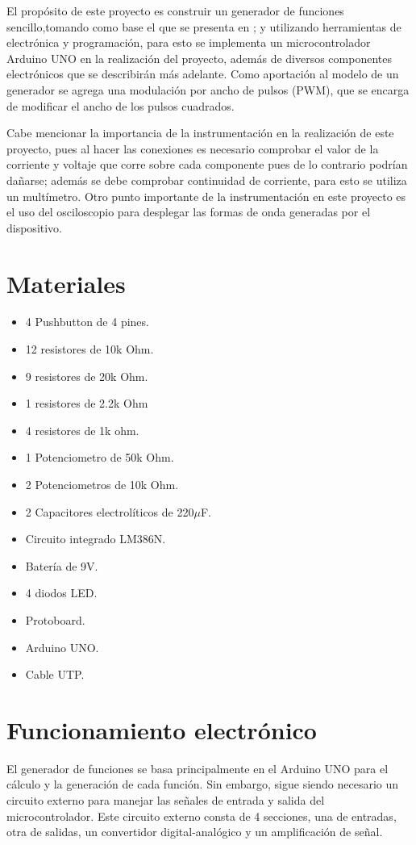 \documentclass[11pt]{article}
\begin{document}
El propósito de este proyecto es construir un generador de funciones sencillo,tomando como base el que se presenta en \cite{amandaghassaei}; y utilizando herramientas de electrónica y programación, para esto se implementa un microcontrolador Arduino UNO en la realización del proyecto, además de diversos componentes electrónicos que se describirán más adelante. Como aportación al modelo de un generador se agrega una modulación por ancho de pulsos (PWM), que se encarga de modificar el ancho de los pulsos cuadrados.

Cabe mencionar la importancia de la instrumentación en la realización de este proyecto, pues al hacer las conexiones es necesario comprobar el valor de la corriente y voltaje que corre sobre cada componente pues de lo contrario podrían dañarse; además se debe comprobar continuidad de corriente, para esto se utiliza un multímetro. Otro punto importante de la instrumentación en este proyecto es el uso del osciloscopio para desplegar las formas de onda generadas por el dispositivo.



\section{Materiales}
\begin{multicols}{2}
\begin{itemize}
\item 4 Pushbutton de 4 pines.
\item 12 resistores de 10k Ohm.
\item 9 resistores de 20k Ohm.
\item 1 resistores de 2.2k Ohm
\item 4 resistores de 1k ohm. 
\item 1 Potenciometro de 50k Ohm.
\item 2 Potenciometros de 10k Ohm.
\item 2 Capacitores electrolíticos de 220$\mu$F.
\item Circuito integrado LM386N.
\item Batería de 9V.
\item 4 diodos LED.
\item Protoboard.
\item Arduino UNO.
\item Cable UTP.
\end{itemize}
\end{multicols}

\section{Funcionamiento electrónico}
El generador de funciones se basa principalmente en el Arduino UNO para el cálculo y la generación de cada función. Sin embargo, sigue siendo necesario un circuito externo para manejar las señales de entrada y salida del microcontrolador. Este circuito externo consta de 4 secciones, una de entradas, otra de salidas, un convertidor digital-analógico y un amplificación de señal.
\end{document}
